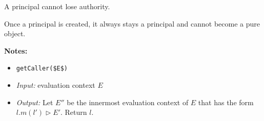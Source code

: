 \documentclass{llncs}
\newcommand{\keywadj}[1]{\mathtt{#1}}
\newcommand{\keyw}[1]{\keywadj{#1}~}
\begin{document}
%
%
%
%
%  


\vspace{8pt}

\begin{theorem}
A principal cannot lose authority.
\end{theorem}

\begin{corollary}
Once a principal is created, it always stays a principal and cannot become a pure object.
\end{corollary}

\vspace{10pt}

\noindent\textbf{Notes:}

\begin{itemize}
\item \lstinline{getCaller($E$)}
\item[] \emph{Input:} evaluation context $E$
\item[] \emph{Output:} Let $E''$ be the innermost evaluation context of $E$ that has the form $l.m(l') \rhd E'$. Return $l$.
\end{itemize}
\end{document}
